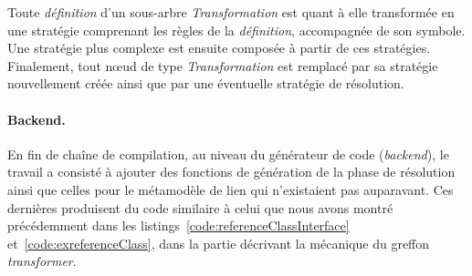 Toute \emph{définition} d'un sous-arbre \emph{Transformation} est quant à elle
transformée en une stratégie comprenant les règles de la \emph{définition},
accompagnée de son symbole. Une stratégie plus complexe est ensuite composée à
partir de ces stratégies. Finalement, tout nœud de type \emph{Transformation}
est remplacé par sa stratégie nouvellement créée ainsi que par une éventuelle
stratégie de résolution.




\paragraph{Backend.} En fin de chaîne de compilation, au niveau du générateur
de code (\emph{backend}), le travail a consisté à ajouter des fonctions de
génération de la phase de résolution ainsi que celles pour le métamodèle de
lien qui n'existaient pas auparavant. Ces dernières produisent du code
similaire à celui que nous avons montré précédemment dans les
listings~\ref{code:referenceClassInterface} et~\ref{code:exreferenceClass},
dans la partie décrivant la mécanique du greffon \emph{transformer}.

%



